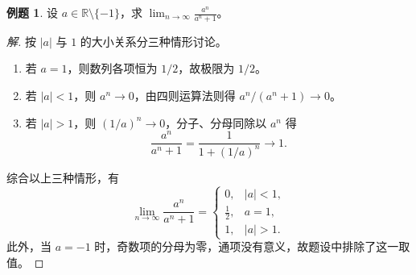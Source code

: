 \documentclass[UTF8, fontset=fandol, a4paper, 12pt]{ctexart}
\newcommand{\R}{\mathbb R}
\theoremstyle{definition}
\newtheorem{example}{例题}
\begin{document}
\begin{example}
设 $a\in\R\setminus\{-1\}$，求
$\displaystyle\lim_{n\to\infty}\frac{a^n}{a^n+1}$。
\end{example}
\begin{proof}[解]
按 $|a|$ 与 $1$ 的大小关系分三种情形讨论。
\begin{enumerate}
\item 若 $a=1$，则数列各项恒为 $1/2$，故极限为 $1/2$。
\item 若 $|a|<1$，则 $a^n\to0$，由四则运算法则得 $a^n/(a^n+1)\to0$。
\item 若 $|a|>1$，则 $(1/a)^n\to0$，分子、分母同除以 $a^n$ 得
\[
 \frac{a^n}{a^n+1}=\frac1{1+(1/a)^n}\longrightarrow1.
\]
\end{enumerate}
综合以上三种情形，有
\[
 \lim_{n\to\infty}\frac{a^n}{a^n+1}
 =\begin{cases}
 0,&|a|<1,\\
 \tfrac12,&a=1,\\
 1,&|a|>1.
 \end{cases}
\]
此外，当 $a=-1$ 时，奇数项的分母为零，通项没有意义，故题设中排除了这一取值。
\end{proof}
\end{document}
